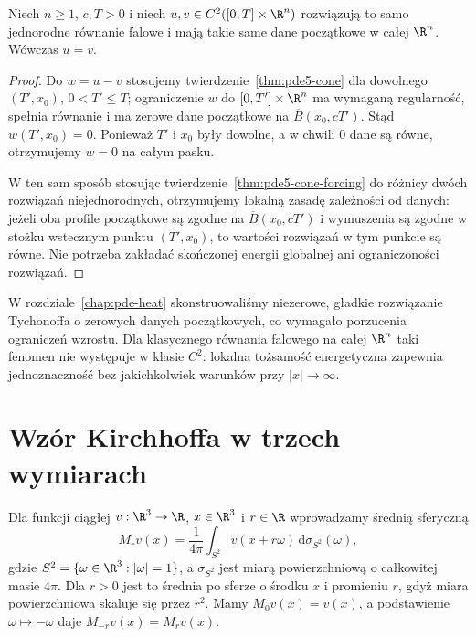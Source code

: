 \begin{wniosek}
\label{cor:pde5-uniqueness}
Niech $n\ge1$, $c,T>0$ i niech
$u,v\in C^2([0,T]\times\R^n)$ rozwiązują to samo
jednorodne równanie falowe i mają takie same dane
początkowe w całej $\R^n$. Wówczas $u=v$.
\end{wniosek}
\begin{proof}
Do $w=u-v$ stosujemy twierdzenie~\ref{thm:pde5-cone}
dla dowolnego $(T',x_0)$, $0<T'\le T$;
ograniczenie $w$ do $[0,T']\times\R^n$ ma
wymaganą regularność, spełnia równanie i ma
zerowe dane początkowe na $\overline B(x_0,cT')$.
Stąd $w(T',x_0)=0$. Ponieważ $T'$ i $x_0$
były dowolne, a w chwili $0$ dane są równe,
otrzymujemy $w=0$ na całym pasku.

W ten sam sposób stosując
twierdzenie~\ref{thm:pde5-cone-forcing} do różnicy
dwóch rozwiązań niejednorodnych, otrzymujemy
lokalną zasadę zależności od danych:
jeżeli oba profile początkowe są zgodne na
$\overline B(x_0,cT')$ i wymuszenia są zgodne
w stożku wstecznym punktu $(T',x_0)$, to wartości
rozwiązań w tym punkcie są równe.
Nie potrzeba zakładać skończonej energii
globalnej ani ograniczoności rozwiązań.
\end{proof}

\begin{uwaga}
W rozdziale~\ref{chap:pde-heat} skonstruowaliśmy
niezerowe, gładkie rozwiązanie Tychonoffa o zerowych
danych początkowych, co wymagało porzucenia ograniczeń
wzrostu. Dla klasycznego równania falowego na całej
$\R^n$ taki fenomen nie występuje w klasie $C^2$:
lokalna tożsamość energetyczna zapewnia jednoznaczność
bez jakichkolwiek warunków przy $|x|\to\infty$.
\end{uwaga}

\section{Wzór Kirchhoffa w trzech wymiarach}
\label{sec:pde5-kirchhoff}

Dla funkcji ciągłej $v:\R^3\to\R$, $x\in\R^3$
i $r\in\R$ wprowadzamy średnią sferyczną
\begin{equation}\label{eq:pde5-sphere}
 M_rv(x)=\frac1{4\pi}\int_{S^2}v(x+r\omega)
 \,\mathrm d\sigma_{S^2}(\omega),
\end{equation}
gdzie $S^2=\{\omega\in\R^3:|\omega|=1\}$,
a $\sigma_{S^2}$ jest miarą powierzchniową
o całkowitej masie $4\pi$. Dla $r>0$ jest to
średnia po sferze o środku $x$ i promieniu $r$,
gdyż miara powierzchniowa skaluje się przez $r^2$.
Mamy $M_0v(x)=v(x)$, a podstawienie
$\omega\mapsto-\omega$ daje $M_{-r}v(x)=M_rv(x)$.

